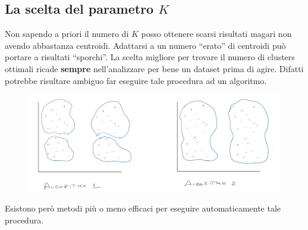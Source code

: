 \subsection{La scelta del parametro $K$}
Non sapendo a priori il numero di $K$ posso ottenere scarsi risultati magari non
avendo abbastanza centroidi. Adattarsi a un numero
``erato'' di centroidi può portare a risultati ``sporchi''. La scelta migliore per trovare il numero di clusters ottimali ricade \textbf{sempre} nell'analizzare per bene un dataset prima di agire. Difatti potrebbe risultare ambiguo far eseguire tale procedura ad un algoritmo.
     \begin{figure}[H]
    \centering
    \includegraphics[width=1\textwidth]{img/kmeans11.PNG}
\end{figure}
Esistono però metodi più o meno efficaci per eseguire automaticamente tale procedura.
